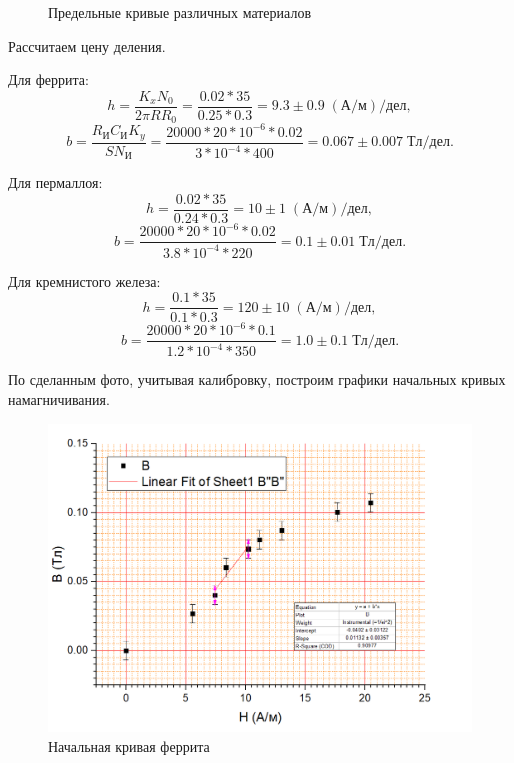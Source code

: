 \documentclass[a4paper]{article}
\begin{document}
\begin{figure}[tbp]
	\label{fig:предельные-кривые}
	\caption{Предельные кривые различных материалов}
\end{figure}

Рассчитаем цену деления.

Для феррита:
\begin{equation*}\label{key}
	h = \frac{K_x N_0}{2 \pi R R_0} = \frac{0.02 * 35}{0.25*0.3} = 9.3 \pm 0.9 \; (А / м) / дел,
\end{equation*}
\begin{equation*}\label{key}
	b = \frac{R_И C_И K_y}{S N_И} = \frac{20000 * 20*10^{-6} * 0.02}{3*10^{-4}*400} = 0.067\pm 0.007 \; Тл / дел.
\end{equation*}

Для пермаллоя:
\begin{equation*}\label{key}
	h = \frac{0.02 * 35}{0.24 * 0.3} = 10\pm 1\; (А / м) / дел,
\end{equation*}
\begin{equation}\label{key}
	b = \frac{20000 * 20*10^{-6} * 0.02}{3.8 * 10^{-4} * 220} = 0.1\pm 0.01\; Тл / дел.
\end{equation}

Для кремнистого железа:
\begin{equation*}\label{key}
	h = \frac{0.1 * 35}{0.1 * 0.3} = 120 \pm 10 \; (А / м) / дел,
\end{equation*}
\begin{equation*}\label{key}
	b = \frac{20000 * 20*10^{-6} * 0.1}{1.2 * 10^{-4} * 350} = 1.0\pm 0.1 \; Тл / дел.
\end{equation*} 

По сделанным фото, учитывая калибровку, построим графики начальных кривых намагничивания.

\begin{figure}[tbp]
	\centering
	\includegraphics[width=0.8\linewidth]{Феррит}
	\caption{Начальная кривая феррита}
	\label{fig:феррит}
\end{figure}
\end{document}
